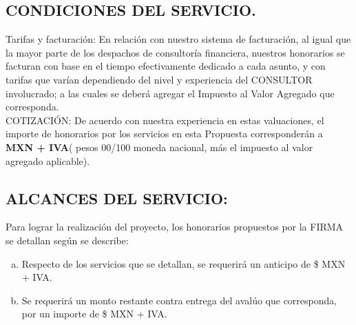 \documentclass[5pt,letter]{article}
\begin{document}
 \begin{center}
 \section{CONDICIONES DEL SERVICIO.}
 \end{center}
 
\textcolor{principal}{Tarifas y facturación:} En relación con nuestro sistema de facturación, al igual que la mayor parte de los despachos de consultoría financiera, nuestros honorarios se facturan con base en el tiempo efectivamente dedicado a cada asunto, y con tarifas que varían dependiendo del
nivel y experiencia del CONSULTOR involucrado; a las cuales se deberá agregar el Impuesto
al Valor Agregado que corresponda.\\


\textcolor{principal}{COTIZACIÓN:} De acuerdo con nuestra experiencia en estas valuaciones, el importe de honorarios por los servicios en esta Propuesta corresponderán a \textbf{\textcolor{principal}{MXN \honorarios{}  + IVA}}(\honorariosLetra{} pesos 00/100 moneda nacional, más el impuesto al valor agregado aplicable).\\





\begin{center}
\section{ALCANCES DEL SERVICIO:}
\end{center}

Para lograr la realización del proyecto, los honorarios propuestos por la FIRMA se detallan según se describe:\\
 
 \begin{enumerate}[a)]
 \item Respecto de los servicios que se detallan, se requerirá un anticipo de \$\anticipo{} MXN
 + IVA.
 
 \item Se requerirá un monto restante contra entrega del avalúo que corresponda, por un
 importe de \$\liquidacion{} MXN + IVA.
 
 \end{enumerate}
 
\end{document}
